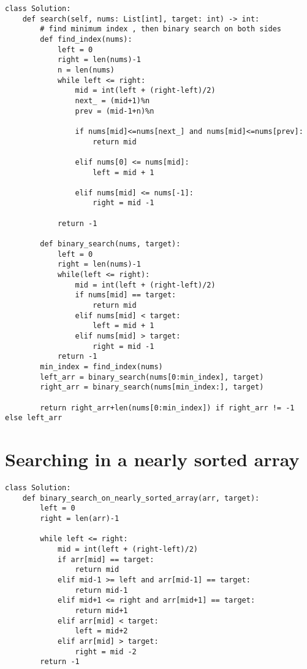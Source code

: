 \documentclass[24pt, a4]{article}
\begin{document}
\begin{lstlisting}
class Solution:
    def search(self, nums: List[int], target: int) -> int:
        # find minimum index , then binary search on both sides
        def find_index(nums):
            left = 0
            right = len(nums)-1
            n = len(nums)
            while left <= right:
                mid = int(left + (right-left)/2)
                next_ = (mid+1)%n
                prev = (mid-1+n)%n

                if nums[mid]<=nums[next_] and nums[mid]<=nums[prev]:
                    return mid
                
                elif nums[0] <= nums[mid]:
                    left = mid + 1
                
                elif nums[mid] <= nums[-1]:
                    right = mid -1
            
            return -1
        
        def binary_search(nums, target):
            left = 0
            right = len(nums)-1
            while(left <= right):
                mid = int(left + (right-left)/2)
                if nums[mid] == target:
                    return mid
                elif nums[mid] < target:
                    left = mid + 1
                elif nums[mid] > target:
                    right = mid -1
            return -1
        min_index = find_index(nums)
        left_arr = binary_search(nums[0:min_index], target)
        right_arr = binary_search(nums[min_index:], target)
        
        return right_arr+len(nums[0:min_index]) if right_arr != -1 else left_arr
\end{lstlisting}
\newpage
\section{Searching in a nearly sorted array}
\begin{lstlisting}
class Solution:
    def binary_search_on_nearly_sorted_array(arr, target):
        left = 0
        right = len(arr)-1

        while left <= right:
            mid = int(left + (right-left)/2)
            if arr[mid] == target:
                return mid
            elif mid-1 >= left and arr[mid-1] == target:
                return mid-1
            elif mid+1 <= right and arr[mid+1] == target:
                return mid+1
            elif arr[mid] < target:
                left = mid+2
            elif arr[mid] > target:
                right = mid -2 
        return -1 
\end{lstlisting}
\newpage
\end{document}
